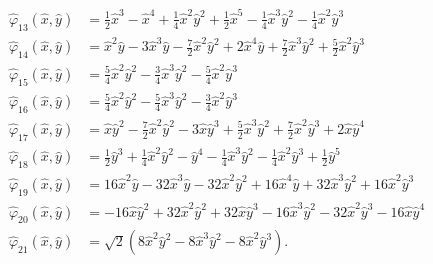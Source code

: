 \begin{equation}
\begin{split}
  \hat{\varphi}_{13}(\hat{x},\hat{y}) &= \frac{1}{2}\hat{x}^3-\hat{x}^4+\frac{1}{4}\hat{x}^2\hat{y}^2+\frac{1}{2}\hat{x}^5-\frac{1}{4}\hat{x}^3\hat{y}^2-\frac{1}{4}\hat{x}^2\hat{y}^3 \\
  \hat{\varphi}_{14}(\hat{x},\hat{y}) &= \hat{x}^2\hat{y}-3\hat{x}^3\hat{y}-\frac{7}{2}\hat{x}^2\hat{y}^2+2\hat{x}^4\hat{y}+\frac{7}{2}\hat{x}^3\hat{y}^2+\frac{5}{2}\hat{x}^2\hat{y}^3 \\
  \hat{\varphi}_{15}(\hat{x},\hat{y}) &= \frac{5}{4}\hat{x}^2\hat{y}^2-\frac{3}{4}\hat{x}^3\hat{y}^2-\frac{5}{4}\hat{x}^2\hat{y}^3 \\
  \hat{\varphi}_{16}(\hat{x},\hat{y}) &= \frac{5}{4}\hat{x}^2\hat{y}^2-\frac{5}{4}\hat{x}^3\hat{y}^2-\frac{3}{4}\hat{x}^2\hat{y}^3 \\
  \hat{\varphi}_{17}(\hat{x},\hat{y}) &= \hat{x}\hat{y}^2-\frac{7}{2}\hat{x}^2\hat{y}^2-3\hat{x}\hat{y}^3+\frac{5}{2}\hat{x}^3\hat{y}^2+\frac{7}{2}\hat{x}^2\hat{y}^3+2\hat{x}\hat{y}^4 \\
  \hat{\varphi}_{18}(\hat{x},\hat{y}) &= \frac{1}{2}\hat{y}^3+\frac{1}{4}\hat{x}^2\hat{y}^2-\hat{y}^4-\frac{1}{4}\hat{x}^3\hat{y}^2-\frac{1}{4}\hat{x}^2\hat{y}^3+\frac{1}{2}\hat{y}^5 \\
  \hat{\varphi}_{19}(\hat{x},\hat{y}) &= 16\hat{x}^2\hat{y}-32\hat{x}^3\hat{y}-32\hat{x}^2\hat{y}^2+16\hat{x}^4\hat{y}+32\hat{x}^3\hat{y}^2+16\hat{x}^2\hat{y}^3 \\
  \hat{\varphi}_{20}(\hat{x},\hat{y}) &= -16\hat{x}\hat{y}^2+32\hat{x}^2\hat{y}^2+32\hat{x}\hat{y}^3-16\hat{x}^3\hat{y}^2-32\hat{x}^2\hat{y}^3-16\hat{x}\hat{y}^4 \\
  \hat{\varphi}_{21}(\hat{x},\hat{y}) &= \sqrt{2}\left(8\hat{x}^2\hat{y}^2-8\hat{x}^3\hat{y}^2-8\hat{x}^2\hat{y}^3\right).
\end{split}
\label{eqn:Argyris}
\end{equation}

